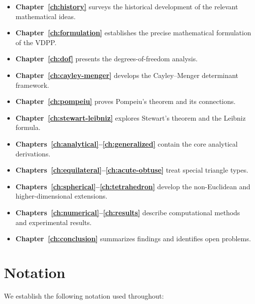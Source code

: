 \begin{itemize}
    \item \textbf{Chapter~\ref{ch:history}} surveys the historical development of the relevant mathematical ideas.
    \item \textbf{Chapter~\ref{ch:formulation}} establishes the precise mathematical formulation of the VDPP.
    \item \textbf{Chapter~\ref{ch:dof}} presents the degrees-of-freedom analysis.
    \item \textbf{Chapter~\ref{ch:cayley-menger}} develops the Cayley--Menger determinant framework.
    \item \textbf{Chapter~\ref{ch:pompeiu}} proves Pompeiu's theorem and its connections.
    \item \textbf{Chapter~\ref{ch:stewart-leibniz}} explores Stewart's theorem and the Leibniz formula.
    \item \textbf{Chapters~\ref{ch:analytical}--\ref{ch:generalized}} contain the core analytical derivations.
    \item \textbf{Chapters~\ref{ch:equilateral}--\ref{ch:acute-obtuse}} treat special triangle types.
    \item \textbf{Chapters~\ref{ch:spherical}--\ref{ch:tetrahedron}} develop the non-Euclidean and higher-dimensional extensions.
    \item \textbf{Chapters~\ref{ch:numerical}--\ref{ch:results}} describe computational methods and experimental results.
    \item \textbf{Chapter~\ref{ch:conclusion}} summarizes findings and identifies open problems.
\end{itemize}

\section{Notation}

We establish the following notation used throughout:

